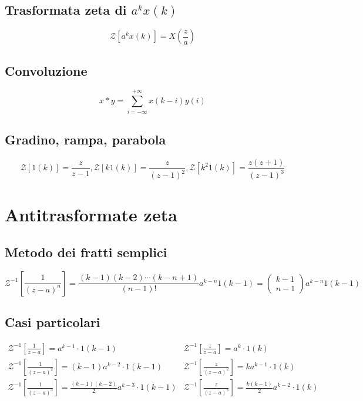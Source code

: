 \documentclass[11pt]{article}
\begin{document}
\subsection{Trasformata zeta di $a^kx(k)$}
\begin{displaymath}
    \mathcal{Z}\left[a^{k} x(k)\right]=X\left(\frac{z}{a}\right)
\end{displaymath}
\subsection{Convoluzione}
\begin{displaymath}
    x * y=\sum_{i=-\infty}^{+\infty} x(k-i) y(i)
\end{displaymath}
\subsection{Gradino, rampa, parabola}
\begin{displaymath}
    \mathcal{Z}[1(k)]=\frac{z}{z-1}, \mathcal{Z}[k 1(k)]=\frac{z}{(z-1)^{2}}, \mathcal{Z}\left[k^{2} 1(k)\right]=\frac{z(z+1)}{(z-1)^{3}}
\end{displaymath}
\section{Antitrasformate zeta}
\subsection{Metodo dei fratti semplici}
\begin{displaymath}
    \mathcal{Z}^{-1}\left[\frac{1}{(z-a)^{n}}\right]=\frac{(k-1)(k-2) \cdots(k-n+1)}{(n-1) !} a^{k-n} 1(k-1)=\left(\begin{array}{c}
            k-1 \\
            n-1
        \end{array}\right) a^{k-n} 1(k-1)
\end{displaymath}
\subsection{Casi particolari}
\begin{displaymath}
    \begin{array}{ll}
        \mathcal{Z}^{-1}\left[\frac{1}{z-a}\right]=a^{k-1} \cdot 1(k-1)                            & \mathcal{Z}^{-1}\left[\frac{z}{z-a}\right]=a^{k} \cdot 1(k)                          \\
        \mathcal{Z}^{-1}\left[\frac{1}{(z-a)^{2}}\right]=(k-1) a^{k-2} \cdot 1(k-1)                & \mathcal{Z}^{-1}\left[\frac{z}{(z-a)^{2}}\right]=k a^{k-1} \cdot 1(k)                \\
        \mathcal{Z}^{-1}\left[\frac{1}{(z-a)^{3}}\right]=\frac{(k-1)(k-2)}{2} a^{k-3} \cdot 1(k-1) & \mathcal{Z}^{-1}\left[\frac{z}{(z-a)^{3}}\right]=\frac{k(k-1)}{2} a^{k-2} \cdot 1(k)
    \end{array}
\end{displaymath}
\end{document}
